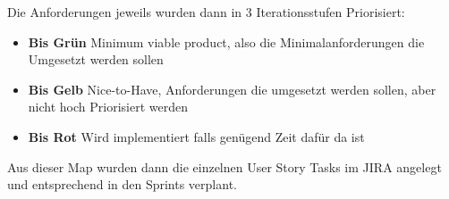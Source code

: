 Die Anforderungen jeweils wurden dann in 3 Iterationsstufen Priorisiert:

\begin{itemize}
    \item \textbf{Bis Grün} Minimum viable product, also die Minimalanforderungen die Umgesetzt werden sollen
    \item \textbf{Bis Gelb} Nice-to-Have, Anforderungen die umgesetzt werden sollen, aber nicht hoch Priorisiert werden
    \item \textbf{Bis Rot} Wird implementiert falls genügend Zeit dafür da ist
\end{itemize}

Aus dieser Map wurden dann die einzelnen User Story Tasks im JIRA angelegt und entsprechend in den Sprints verplant.